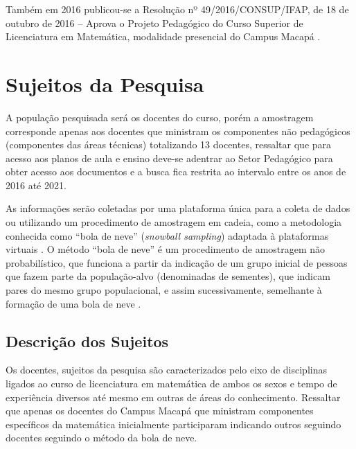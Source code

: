Também em 2016 publicou-se a Resolução nº 49/2016/CONSUP/IFAP, de 18 de outubro de 2016 – Aprova o Projeto Pedagógico do Curso Superior de Licenciatura em Matemática, modalidade presencial do Campus Macapá \cite{ifap2022}.









\section{Sujeitos da Pesquisa}
\label{sujeitos_pesquisa}

A população pesquisada será os docentes do curso, porém a amostragem corresponde apenas aos docentes que ministram os componentes não pedagógicos (componentes das áreas técnicas) totalizando 13 docentes, ressaltar que para acesso aos planos de aula e ensino deve-se adentrar ao Setor Pedagógico para obter acesso aos documentos e a busca fica restrita ao intervalo entre os anos de 2016 até 2021.


As informações serão coletadas por uma plataforma única para a coleta de dados ou utilizando um procedimento de amostragem em cadeia, como a metodologia conhecida como “bola de neve” (\textit{snowball sampling}) adaptada à plataformas virtuais \cite{szwarcwald2021convid}. O método “bola de neve” é um procedimento de amostragem não probabilístico, que funciona a partir da indicação de um grupo inicial de pessoas que fazem parte da população-alvo (denominadas de sementes), que indicam pares do mesmo grupo populacional, e assim sucessivamente, semelhante à formação de uma bola de neve \cite{szwarcwald2021convid}.





\subsection{Descrição dos Sujeitos}
\label{descricao_sujeitos}


Os docentes, sujeitos da pesquisa são caracterizados pelo eixo de disciplinas ligados ao curso de licenciatura em matemática de ambos os sexos e tempo de experiência diversos até mesmo em outras de áreas do conhecimento. Ressaltar que apenas os docentes do Campus Macapá que ministram componentes específicos da matemática inicialmente participaram indicando outros seguindo docentes seguindo o método da bola de neve.








